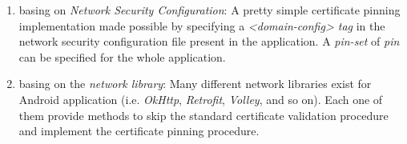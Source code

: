 			\begin{enumerate}
				\item basing on \textit{Network Security Configuration}: A pretty simple certificate pinning implementation made possible by specifying a \textit{<domain-config> tag} in the network security configuration file present in the application. A \textit{pin-set} of \textit{pin} can be specified for the whole application.
				\item basing on the \textit{network library}: Many different network libraries exist for Android application (i.e. \textit{OkHttp}, \textit{Retrofit}, \textit{Volley}, and so on). Each one of them provide methods to skip the standard certificate validation procedure and implement the certificate pinning procedure.
			\end{enumerate}
			
